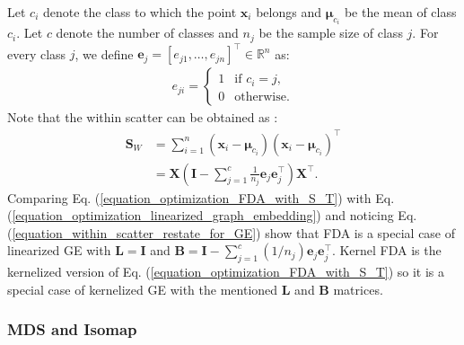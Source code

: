 \documentclass[lang=cn,10pt]{gorgeousnbook}
\numberwithin{equation}{section}%
\numberwithin{figure}{section}%
\begin{document}
Let $c_i$ denote the class to which the point $\boldsymbol{x}_i$ belongs and $\boldsymbol{\mu}_{c_i}$ be the mean of class $c_i$. Let $c$ denote the number of classes and $n_j$ be the sample size of class $j$. For every class $j$, we define $\boldsymbol{e}_j = [e_{j1}, \dots, e_{jn}]^\top \in \mathbb{R}^n$ as:
\begin{align}
e_{ji} = 
\left\{
    \begin{array}{ll}
        1 & \mbox{if } c_i = j, \\
        0 & \mbox{otherwise}.
    \end{array}
\right.
\end{align}
Note that the within scatter can be obtained as \cite{yan2005graph}:
\begin{align}\label{equation_within_scatter_restate_for_GE}
\boldsymbol{S}_W &= \sum_{i=1}^n (\boldsymbol{x}_i - \boldsymbol{\mu}_{c_i}) (\boldsymbol{x}_i - \boldsymbol{\mu}_{c_i})^\top \nonumber \\
&= \boldsymbol{X} (\boldsymbol{I} - \sum_{j=1}^{c} \frac{1}{n_j} \boldsymbol{e}_j \boldsymbol{e}_j^\top) \boldsymbol{X}^\top.
\end{align}
Comparing Eq. (\ref{equation_optimization_FDA_with_S_T}) with Eq. (\ref{equation_optimization_linearized_graph_embedding}) and noticing Eq. (\ref{equation_within_scatter_restate_for_GE}) show that FDA is a special case of linearized GE with $\boldsymbol{L} = \boldsymbol{I}$ and $\boldsymbol{B} = \boldsymbol{I} - \sum_{j=1}^{c} (1/n_j) \boldsymbol{e}_j \boldsymbol{e}_j^\top$. 
Kernel FDA \cite{ghojogh2019fisher,mika1999fisher} is the kernelized version of Eq. (\ref{equation_optimization_FDA_with_S_T}) so it is a special case of kernelized GE with the mentioned $\boldsymbol{L}$ and $\boldsymbol{B}$ matrices. 

\subsubsection{MDS and Isomap}
\end{document}
